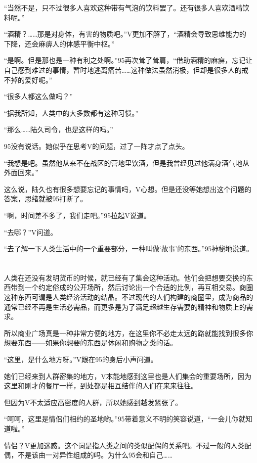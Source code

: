 “当然不是，只不过很多人喜欢这种带有气泡的饮料罢了。还有很多人喜欢酒精饮料呢。”

“酒精？……那是对身体，有害的物质吧。”V更加不解了，“酒精会导致思维能力的下降，还会麻痹人的体感平衡中枢。”

“是啊。但是那也是一种有利之处啊。”95再次耸了耸肩，“借助酒精的麻痹，忘记让自己感到难过的事情，暂时地逃离痛苦……这种做法虽然消极，但却是很多人的戒不掉的爱好呢。”

“很多人都这么做吗？”

“据我所知，人类中的大多数都有这种习惯。”

“那么……陆久司令，也是这样的吗。”

95没有说话。她似乎在思考V的问题，过了一阵才点了点头。

“我想是吧。虽然他从来不在战区的营地里饮酒，但是我曾经见过他满身酒气地从外面回来。”

这么说，陆久也有很多想要忘记的事情吗，V心想。但是还没等她想出这个问题的答案，思绪就被95打断了。

“啊，时间差不多了，我们走吧。”95拉起V说道。

“去哪？”V问道。

“去了解一下人类生活中的一个重要部分，一种叫做‘故事’的东西。”95神秘地说道。



\section*{}

人类在还没有发明货币的时候，就已经有了集会这种活动。他们会把想要交换的东西带到一个约定俗成的公开场所，然后讨论出一个合适的比例，再互相交易。商圈这种东西可谓是人类经济活动的结晶。不过现代的人们构建的商圈里，成为商品的通常已经不再是生活必需品，而更多是为了满足超越生存需要的精神和物质上的需求。

所以商业广场真是一种非常方便的地方，在这里你不必走太远的路就能找到很多你想要东西——如果你想要的东西是休闲和购物之类的话。

“这里，是什么地方呀。”V跟在95的身后小声问道。

她们已经来到人群密集的地方，V本能地感到这里也是人们集会的重要场所，因为这里和刚才的餐厅一样，到处都是相互结伴的人们在来来往往。

但因为V不太适应高密度的人群，所以她感到越发紧张了。

“呵呵，这里是情侣们相约的圣地哟。”95带着意义不明的笑容说道，“一会儿你就知道啦。”

情侣？V更加迷惑。这个词是指人类之间的类似配偶的关系吧。不过一般的人类配偶，不是该由一对异性组成的吗。为什么95会和自己……

